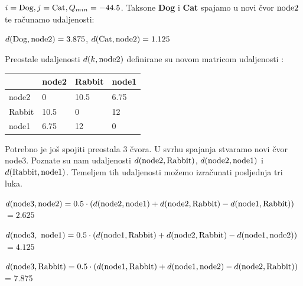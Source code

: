 \documentclass[times, utf8, seminar, numeric]{fer}
\begin{document}
$i = \textup{Dog}, j = \textup{Cat}, Q_{min} = -44.5$. Taksone \textbf{Dog} i \textbf{Cat} spajamo u novi čvor $\textup{node2}$ te računamo udaljenosti: 

\indent $d(\textup{Dog},\textup{node2}) = 3.875$, \newline
\indent $d(\textup{Cat},\textup{node2}) = 1.125$ \newline


Preostale udaljenosti $d(k,\textup{node2})$ definirane su novom matricom udaljenosti :

\begin{table}[h]
	\centering
    \begin{tabular}{|l|l|l|l|}
    \hline
    ~     & node2 & Rabbit    & node1 \\ \hline
    node2 & 0     & 10.5 & 6.75  \\ \hline
    Rabbit     & 10.5  & 0    & 12    \\ \hline
    node1 & 6.75  & 12   & 0     \\ \hline
    \end{tabular}
\end{table}

Potrebno je još spojiti preostala $3$ čvora. U svrhu spajanja stvaramo novi čvor node3. Poznate su nam udaljenosti $d(\textup{node2},\textup{Rabbit})$, $d(\textup{node2}, \textup{node1})$ i  $d(\textup{Rabbit},\textup{node1})$. Temeljem tih udaljenosti možemo izračunati posljednja tri luka. \newline

\indent $d(\textup{node3}, \textup{node2}) = 0.5 \cdot (d(\textup{node2}, \textup{node1}) + d(\textup{node2}, \textup{Rabbit}) - d(\textup{node1}, \textup{Rabbit})) $ \newline
\indent $= 2.625$ \newline

\indent $d(\textup{node3},\textup{ node1}) = 0.5 \cdot (d(\textup{node1}, \textup{Rabbit}) + d(\textup{node2}, \textup{Rabbit}) - d(\textup{node1}, \textup{node2})) $ \newline
\indent $=4.125 $ \newline

\indent $d(\textup{node3},\textup{Rabbit}) = 0.5 \cdot (d(\textup{node1}, \textup{Rabbit}) + d(\textup{node1}, \textup{node2}) - d(\textup{node2}, \textup{Rabbit})) $ \newline
\indent = 7.875 \newline
\end{document}
